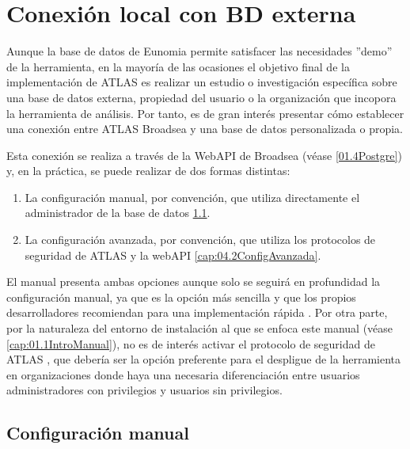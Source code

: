 \chapter{Conexión local con BD externa} \label{cap:04BDEXt}

Aunque la base de datos de Eunomia permite satisfacer las necesidades ''demo'' de la herramienta, en la mayoría de las ocasiones el objetivo final de la implementación de ATLAS es realizar un estudio o investigación específica sobre una base de datos externa, propiedad del usuario o la organización que incopora la herramienta de análisis. Por tanto, es de gran interés presentar cómo establecer una conexión entre ATLAS Broadsea y una base de datos personalizada o propia. 

Esta conexión se realiza a través de la WebAPI de Broadsea (véase \ref{01.4Postgre}) y, en la práctica, se puede realizar de dos formas distintas: 

\begin{enumerate}
    \item La configuración manual, por convención, que utiliza directamente el administrador de la base de datos \ref{cap:04ConfiguracionPgAdmin}. 
    \item La configuración avanzada, por convención, que utiliza los protocolos de seguridad de ATLAS y la webAPI \ref{cap:04.2ConfigAvanzada}.
\end{enumerate}

El manual presenta ambas opciones aunque solo se seguirá en profundidad la configuración manual, ya que es la opción más sencilla y que los propios desarrolladores recomiendan para una implementación rápida \cite{forumAddMSDB}. Por otra parte, por la naturaleza del entorno de instalación al que se enfoca este manual (véase \ref{cap:01.1IntroManual}), no es de interés activar el protocolo de seguridad de ATLAS , que debería ser la opción preferente para el despligue de la herramienta en organizaciones donde haya una necesaria diferenciación entre usuarios administradores con privilegios y usuarios sin privilegios. 


\section{Configuración manual} \label{cap:04ConfiguracionPgAdmin}

